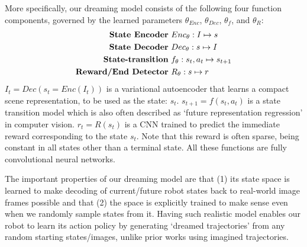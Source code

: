 \documentclass[letterpaper, 10 pt, conference]{ieeeconf}
\newcommand{\aj}[1]{\fxnote{\hl{AJ: #1}}}
\begin{document}
More specifically, our dreaming model consists of the following four function components, governed by the learned parameters $\theta_{Enc}$, $\theta_{Dec}$, $\theta_f$, and $\theta_R$:
\begin{align*}
\mbox{\textbf{State Encoder} } & Enc_{\theta}: I \mapsto s
\\
\mbox{\textbf{State Decoder} } & Dec_{\theta}: s \mapsto I
\\
\mbox{\textbf{State-transition} } & f_{\theta}: s_t,a_t \mapsto s_{t+1}
\\
\mbox{\textbf{Reward/End Detector} } & R_{\theta}: s \mapsto r
\end{align*}
$I_t = Dec(s_t = Enc(I_t))$ is a variational autoencoder that learns a compact scene representation, to be used as the state: $s_t$.
$s_{t+1} = f(s_t, a_t)$ is a state transition model which is also often described as `future representation regression' in computer vision.
$r_t = R(s_t)$ is a CNN trained to predict the immediate reward corresponding to the state $s_t$. Note that this reward is often sparse, being constant in all states other than a terminal state.
All these functions are fully convolutional neural networks.

The important properties of our dreaming model are that (1) its state space is learned to make decoding of current/future robot states back to real-world image frames possible and that (2) the space is explicitly trained to make sense even when we randomly sample states from it. Having such realistic model enables our robot to learn its action policy by generating `dreamed trajectories' from any random starting states/images, unlike prior works using imagined trajectories.%

\end{document}
